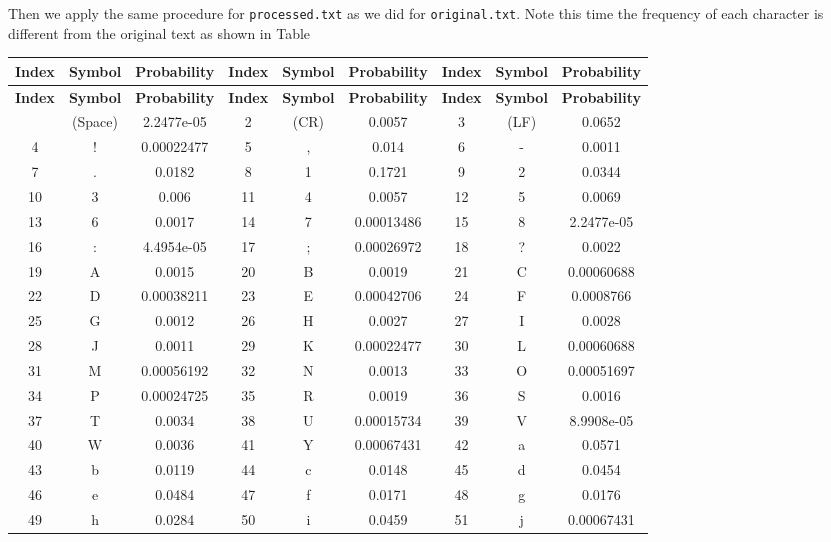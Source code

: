 \documentclass[12pt,twoside]{article}
\begin{document}
Then we apply the same procedure for \texttt{processed.txt} as we did for \texttt{original.txt}. Note this time the frequency of each character is different from the original text as shown in Table~

\begin{longtable}{ccc||ccc||ccc}
    \toprule
    \textbf{Index} & \textbf{Symbol} & \textbf{Probability} & \textbf{Index} & \textbf{Symbol} & \textbf{Probability} & \textbf{Index} & \textbf{Symbol} & \textbf{Probability} \\ \hline
    \endfirsthead
    \hline
    \textbf{Index} & \textbf{Symbol} & \textbf{Probability} & \textbf{Index} & \textbf{Symbol} & \textbf{Probability} & \textbf{Index} & \textbf{Symbol} & \textbf{Probability} \\ \hline
    \endhead
    \hline
    \endfoot
    1 & (Space) & 2.2477e-05 & 2 & (CR) & 0.0057 & 3 & (LF) & 0.0652 \\ 
    4 & ! & 0.00022477 & 5 & , & 0.014 & 6 & - & 0.0011 \\ 
    7 & . & 0.0182 & 8 & 1 & 0.1721 & 9 & 2 & 0.0344 \\ 
    10 & 3 & 0.006 & 11 & 4 & 0.0057 & 12 & 5 & 0.0069 \\ 
    13 & 6 & 0.0017 & 14 & 7 & 0.00013486 & 15 & 8 & 2.2477e-05 \\ 
    16 & : & 4.4954e-05 & 17 & ; & 0.00026972 & 18 & ? & 0.0022 \\ 
    19 & A & 0.0015 & 20 & B & 0.0019 & 21 & C & 0.00060688 \\ 
    22 & D & 0.00038211 & 23 & E & 0.00042706 & 24 & F & 0.0008766 \\ 
    25 & G & 0.0012 & 26 & H & 0.0027 & 27 & I & 0.0028 \\ 
    28 & J & 0.0011 & 29 & K & 0.00022477 & 30 & L & 0.00060688 \\ 
    31 & M & 0.00056192 & 32 & N & 0.0013 & 33 & O & 0.00051697 \\ 
    34 & P & 0.00024725 & 35 & R & 0.0019 & 36 & S & 0.0016 \\ 
    37 & T & 0.0034 & 38 & U & 0.00015734 & 39 & V & 8.9908e-05 \\ 
    40 & W & 0.0036 & 41 & Y & 0.00067431 & 42 & a & 0.0571 \\ 
    43 & b & 0.0119 & 44 & c & 0.0148 & 45 & d & 0.0454 \\ 
    46 & e & 0.0484 & 47 & f & 0.0171 & 48 & g & 0.0176 \\ 
    49 & h & 0.0284 & 50 & i & 0.0459 & 51 & j & 0.00067431 \\ 

\end{longtable}
\end{document}
